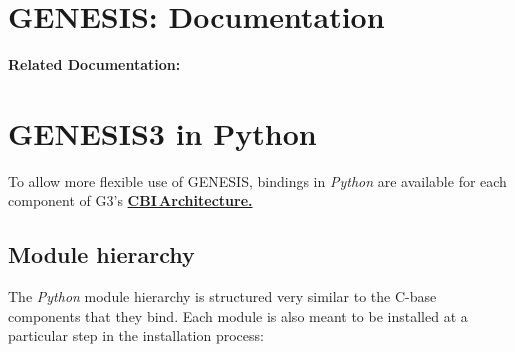 \documentclass[12pt]{article}
\begin{document}
\section*{GENESIS: Documentation}

{\bf Related Documentation:}

\section*{GENESIS3 in Python}

	To allow more flexible use of GENESIS, bindings in {\it Python} are available for each component of G3's \href{../cbi-architecture/cbi-architecture.tex}{\bf CBI\,Architecture.} 

\subsection*{Module hierarchy}

	The {\it Python} module hierarchy is structured very similar to the C-base components that they bind. Each module is also meant to be installed at a particular step in the installation process:
	
\end{document}
